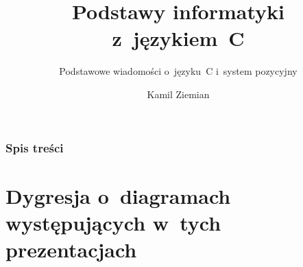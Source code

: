 \documentclass[10pt,t]{beamer}
\title{Podstawy informatyki z~językiem~C}
\subtitle{Podstawowe wiadomości o~języku~C i~system pozycyjny}
\author{Kamil Ziemian}
\begin{document}





\RaggedRight





\maketitle





\begin{frame}
  \frametitle{Spis treści}


  \tableofcontents

\end{frame}





\section{Dygresja o~diagramach występujących w~tych
  prezentacjach}
\end{document}

